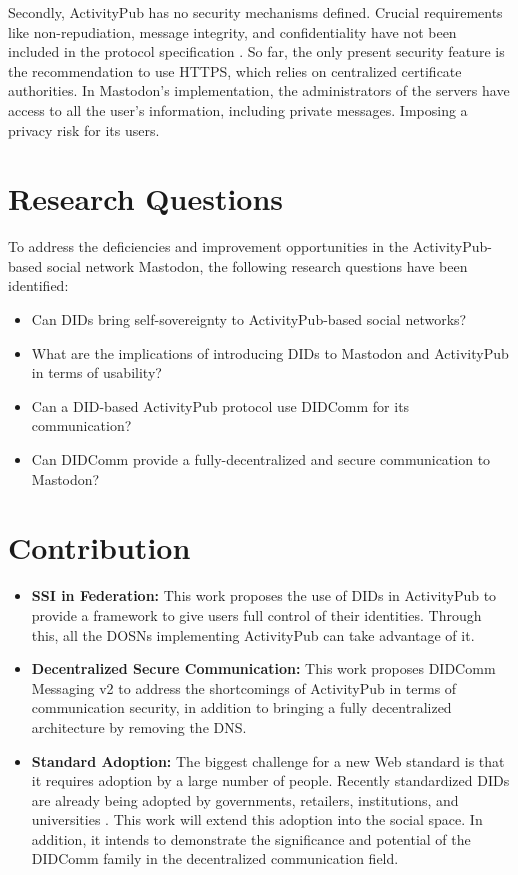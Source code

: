 Secondly, ActivityPub has no security mechanisms defined. Crucial requirements like non-repudiation, message integrity, and confidentiality have not been included in the protocol specification \cite{sporny_longley_sabadello_reed_steele_2021}. So far, the only present security feature is the recommendation to use HTTPS, which relies on centralized certificate authorities. In Mastodon's implementation, the administrators of the servers have access to all the user's information, including private messages. Imposing a privacy risk for its users. 


\section{Research Questions}
To address the deficiencies and improvement opportunities in the ActivityPub-based social network Mastodon, the following research questions have been identified: 

\begin{itemize}
  \item Can DIDs bring self-sovereignty to ActivityPub-based social networks?
  \item What are the implications of introducing DIDs to Mastodon and ActivityPub in terms of usability?
  \item Can a DID-based ActivityPub protocol use DIDComm for its communication?
  \item Can DIDComm provide a fully-decentralized and secure communication to Mastodon?
\end{itemize}

\pagebreak
\section{Contribution}

\begin{itemize}
  \item \textbf{SSI in Federation:}
  This work proposes the use of DIDs in ActivityPub to provide a framework to give users full control of their identities. Through this, all the DOSNs implementing ActivityPub can take advantage of it.
  \item \textbf{Decentralized Secure Communication:}
  This work proposes DIDComm Messaging v2 to address the shortcomings of ActivityPub in terms of communication security, in addition to bringing a fully decentralized architecture by removing the  DNS.
  \item \textbf{Standard Adoption:}
  The biggest challenge for a new Web standard is that it requires adoption by a large number of people. Recently standardized DIDs are already being adopted by governments, retailers, institutions, and universities \cite{w3c_2022}. This work will extend this adoption into the social space. In addition, it intends to demonstrate the significance and potential of the DIDComm family in the decentralized communication field. 
\end{itemize}



